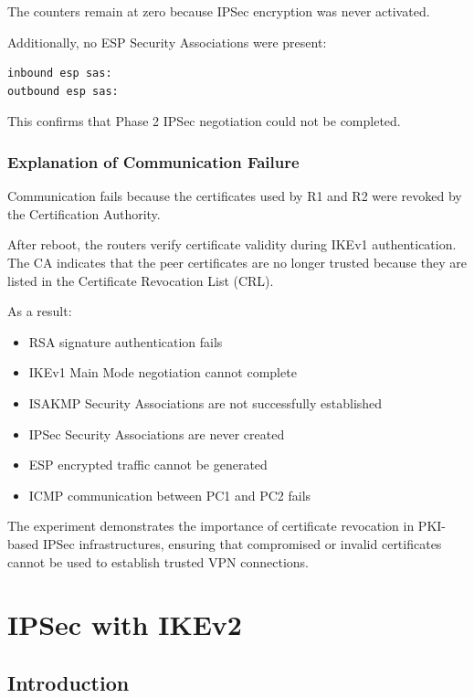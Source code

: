 \documentclass[12pt]{article}
\begin{document}
The counters remain at zero because IPSec encryption was never activated.

Additionally, no ESP Security Associations were present:

\begin{verbatim}
inbound esp sas:
outbound esp sas:
\end{verbatim}

This confirms that Phase 2 IPSec negotiation could not be completed.

\subsubsection{Explanation of Communication Failure}

Communication fails because the certificates used by R1 and R2 were revoked by the Certification Authority.

After reboot, the routers verify certificate validity during IKEv1 authentication. The CA indicates that the peer certificates are no longer trusted because they are listed in the Certificate Revocation List (CRL).

As a result:

\begin{itemize}
\item RSA signature authentication fails
\item IKEv1 Main Mode negotiation cannot complete
\item ISAKMP Security Associations are not successfully established
\item IPSec Security Associations are never created
\item ESP encrypted traffic cannot be generated
\item ICMP communication between PC1 and PC2 fails
\end{itemize}

The experiment demonstrates the importance of certificate revocation in PKI-based IPSec infrastructures, ensuring that compromised or invalid certificates cannot be used to establish trusted VPN connections.

\section{IPSec with IKEv2}

\subsection{Introduction}
\end{document}
